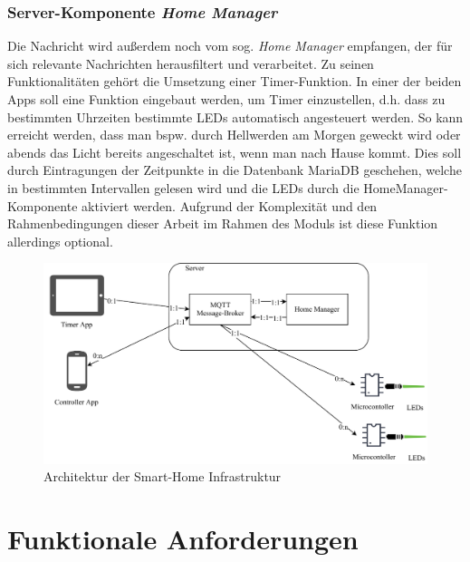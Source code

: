 \subsubsection*{Server-Komponente \textit{Home Manager}}
Die Nachricht wird außerdem noch vom sog. \textit{Home Manager} empfangen, der für sich relevante Nachrichten herausfiltert und verarbeitet. Zu seinen Funktionalitäten gehört die Umsetzung einer Timer-Funktion. In einer der beiden Apps soll eine Funktion eingebaut werden, um Timer einzustellen, d.h. dass zu bestimmten Uhrzeiten bestimmte LEDs automatisch angesteuert werden. So kann erreicht werden, dass man bspw. durch Hellwerden am Morgen geweckt wird oder abends das Licht bereits angeschaltet ist, wenn man nach Hause kommt. Dies soll durch Eintragungen der Zeitpunkte in die Datenbank MariaDB geschehen, welche in bestimmten Intervallen gelesen wird und die LEDs durch die HomeManager-Komponente aktiviert werden. Aufgrund der Komplexität und den Rahmenbedingungen dieser Arbeit im Rahmen des Moduls  ist diese Funktion allerdings optional.


\begin{figure}
	\centering
	\includegraphics[width=\linewidth]{../images/architecture}
	\caption[Architektur der Smart-Home Infrastruktur]{Architektur der Smart-Home Infrastruktur}
	\label{fig:architecture}
\end{figure}


\section{Funktionale Anforderungen}

